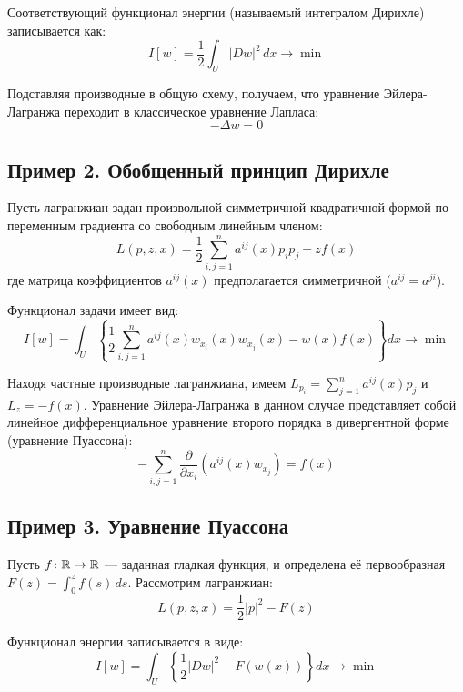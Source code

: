 Соответствующий функционал энергии (называемый интегралом Дирихле) записывается как:
\begin{equation}
    I[w] = \frac{1}{2} \int_U |Dw|^2 \, dx \rightarrow \min
\end{equation}

Подставляя производные в общую схему, получаем, что уравнение Эйлера-Лагранжа 
переходит в классическое уравнение Лапласа:
\begin{equation}
    -\Delta w = 0
\end{equation}

\subsection{Пример 2. Обобщенный принцип Дирихле}
Пусть лагранжиан задан произвольной симметричной квадратичной формой по 
переменным градиента со свободным линейным членом:
\begin{equation}
    L(p,z,x) = \frac{1}{2}\sum_{i,j=1}^n a^{ij}(x)p_i p_j - z f(x)
\end{equation}
где матрица коэффициентов $a^{ij}(x)$ предполагается симметричной 
($a^{ij} = a^{ji}$).

Функционал задачи имеет вид:
\begin{equation}
    I[w] = \int_U \left\{ \frac{1}{2}\sum_{i,j=1}^n a^{ij}(x)w_{x_i}(x)w_{x_j}(x) - w(x)f(x) \right\} dx \rightarrow \min
\end{equation}

Находя частные производные лагранжиана, имеем 
$L_{p_i} = \sum_{j=1}^n a^{ij}(x)p_j$ и $L_z = -f(x)$. 
Уравнение Эйлера-Лагранжа в данном случае представляет собой линейное
дифференциальное уравнение второго порядка в дивергентной форме 
(уравнение Пуассона):
\begin{equation}
    -\sum_{i,j=1}^n \frac{\partial}{\partial x_i} \left( a^{ij}(x) w_{x_j} \right) = f(x)
\end{equation}

\subsection{Пример 3. Уравнение Пуассона}
Пусть $f \colon \mathbb{R} \rightarrow \mathbb{R}$ --- заданная гладкая функция, и определена 
её первообразная $F(z) = \int_0^z f(s)\,ds$. Рассмотрим лагранжиан:
\begin{equation}
    L(p,z,x) = \frac{1}{2}|p|^2 - F(z)
\end{equation}

Функционал энергии записывается в виде:
\begin{equation}
    I[w] = \int_U \left\{ \frac{1}{2}|Dw|^2 - F(w(x)) \right\} dx \rightarrow \min
\end{equation}

